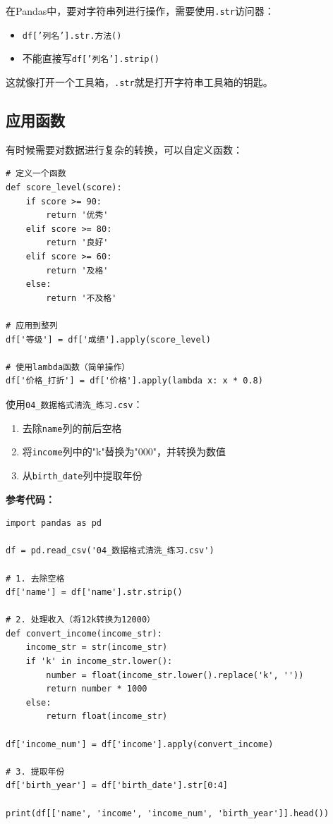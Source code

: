 \documentclass[12pt,a4paper]{article}
\begin{document}
\begin{knowledgebox}
在Pandas中，要对字符串列进行操作，需要使用\texttt{.str}访问器：

\begin{itemize}
    \item \texttt{df['列名'].str.方法()}
    \item 不能直接写\texttt{df['列名'].strip()}
\end{itemize}

这就像打开一个工具箱，\texttt{.str}就是打开字符串工具箱的钥匙。
\end{knowledgebox}

\subsection{应用函数}

有时候需要对数据进行复杂的转换，可以自定义函数：

\begin{lstlisting}[caption={使用apply应用函数}]
# 定义一个函数
def score_level(score):
    if score >= 90:
        return '优秀'
    elif score >= 80:
        return '良好'
    elif score >= 60:
        return '及格'
    else:
        return '不及格'

# 应用到整列
df['等级'] = df['成绩'].apply(score_level)

# 使用lambda函数（简单操作）
df['价格_打折'] = df['价格'].apply(lambda x: x * 0.8)
\end{lstlisting}

\begin{practicebox}[动手练习5]
使用\texttt{04\_数据格式清洗\_练习.csv}：

\begin{enumerate}
    \item 去除\texttt{name}列的前后空格
    \item 将\texttt{income}列中的"k"替换为"000"，并转换为数值
    \item 从\texttt{birth\_date}列中提取年份
\end{enumerate}

\textbf{参考代码：}
\begin{lstlisting}
import pandas as pd

df = pd.read_csv('04_数据格式清洗_练习.csv')

# 1. 去除空格
df['name'] = df['name'].str.strip()

# 2. 处理收入（将12k转换为12000）
def convert_income(income_str):
    income_str = str(income_str)
    if 'k' in income_str.lower():
        number = float(income_str.lower().replace('k', ''))
        return number * 1000
    else:
        return float(income_str)

df['income_num'] = df['income'].apply(convert_income)

# 3. 提取年份
df['birth_year'] = df['birth_date'].str[0:4]

print(df[['name', 'income', 'income_num', 'birth_year']].head())
\end{lstlisting}
\end{practicebox}
\end{document}
